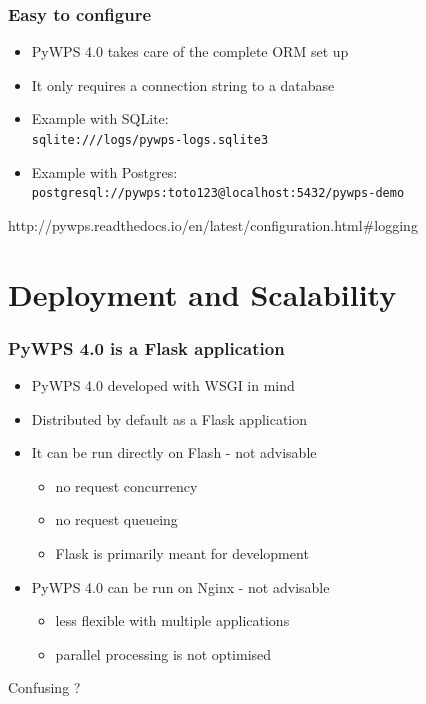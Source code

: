 \documentclass{beamer}
\begin{document}
\begin{frame}
\frametitle<presentation>{Easy to configure}

\begin{itemize}
  \item PyWPS 4.0 takes care of the complete ORM set up
  \item It only requires a connection string to a database
  \item Example with SQLite: \\
  \footnotesize{\texttt{sqlite:///logs/pywps-logs.sqlite3}}
  \item \normalsize{Example with Postgres:}
  \footnotesize{\texttt{postgresql://pywps:toto123@localhost:5432/pywps-demo}}
\end{itemize}

\vspace{0.5cm}

\centering
\footnotesize{http://pywps.readthedocs.io/en/latest/configuration.html\#logging}

\end{frame}




\section{Deployment and Scalability}


\begin{frame}
\frametitle<presentation>{PyWPS 4.0 is a Flask application}

\begin{itemize}
  \item PyWPS 4.0 developed with WSGI in mind
  \item Distributed by default as a Flask application
  \item It can be run directly on Flash - not advisable
  \begin{itemize}
    \item no request concurrency
    \item no request queueing
    \item Flask is primarily meant for development
  \end{itemize}
  \item PyWPS 4.0 can be run on Nginx - not advisable
  \begin{itemize}
    \item less flexible with multiple applications
    \item parallel processing is not optimised
  \end{itemize} 
\end{itemize}

\centering
\huge{Confusing ?}

\end{frame}
\end{document}
